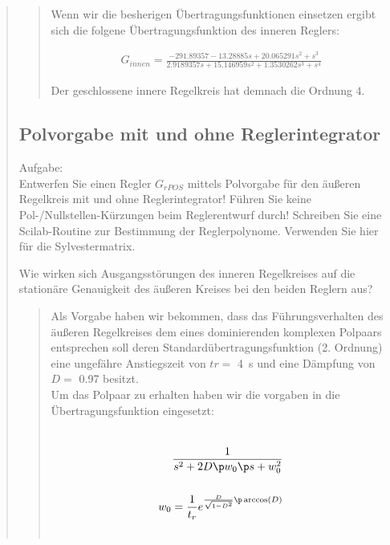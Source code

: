 \begin{quote}
\begin{quote}
        Wenn wir die besherigen Übertragungsfunktionen einsetzen ergibt sich die folgene Übertragungsfunktion des
        inneren Reglers:
        
        \begin{equation*}
        	\begin{split}
        		G_{innen} = \frac{- 291.89357 - 13.28885s + 20.065291s^2 + s^3 }{2.9189357s + 15.146959s^2 + 1.3530262s^3 +
        		s^4 }
        	\end{split}
        \end{equation*}
        
        Der geschlossene innere Regelkreis hat demnach die Ordnung $4$.
        
    \end{quote}  %
    
    \subsection{Polvorgabe mit und ohne Reglerintegrator}
    Aufgabe:\\
    Entwerfen Sie einen Regler $G_{rPOS}$ mittels Polvorgabe für den äußeren Regelkreis mit und ohne Reglerintegrator!
    Führen Sie keine Pol-/Nullstellen-Kürzungen beim Reglerentwurf durch! Schreiben Sie eine Scilab-Routine zur
    Bestimmung der Reglerpolynome. Verwenden Sie hier für die Sylvestermatrix.\vspace{1em}
    
    Wie wirken sich Ausgangsstörungen des inneren Regelkreises auf die stationäre Genauigkeit des äußeren Kreises bei
    den beiden Reglern aus?
    \begin{quote}
        
        Als Vorgabe haben wir bekommen, dass das Führungsverhalten des äußeren Regelkreises dem eines dominierenden komplexen
        Polpaars entsprechen soll deren Standardübertragungsfunktion (2. Ordnung) eine ungefähre Anstiegszeit von $tr =$
        \SI{4}{\second} und eine Dämpfung von $D =$ \SI{0,97}{} besitzt.\\
        Um das Polpaar zu erhalten haben wir die vorgaben in die Übertragungsfunktion eingesetzt:
        
        
        \begin{equation*}
            \begin{split}
                \\
                \frac{1}{s^2 + 2 D \p w_0 \p s + w_0^2}\\
                \\
                w_0 = \frac{1}{t_r} e^{ \frac{D}{\sqrt{1-D^2}} \p \arccos(D) }\\
                \\
            \end{split}
        \end{equation*}
        

\end{quote}
\end{quote}
